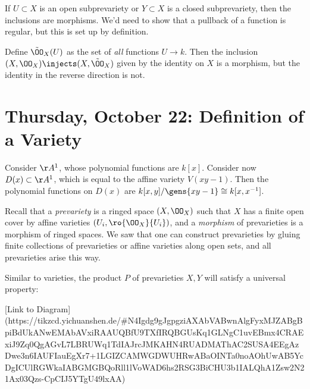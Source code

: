 \begin{remark}

If \(U\subset X\) is an open subprevariety or \(Y\subset X\) is a closed
subprevariety, then the inclusions are morphisms. We'd need to show that
a pullback of a function is regular, but this is set up by definition.

\end{remark}

\begin{remark}

Define \(\tilde \OO_X(U)\) as the set of \emph{all} functions
\(U\to k\). Then the inclusion \((X, \OO_X) \injects (X, \tilde \OO_X)\)
given by the identity on \(X\) is a morphism, but the identity in the
reverse direction is not.

\end{remark}

\hypertarget{thursday-october-22-definition-of-a-variety}{%
\section{Thursday, October 22: Definition of a
Variety}\label{thursday-october-22-definition-of-a-variety}}

\begin{example}

Consider \(\AA^1\), whose polynomial functions are \(k[x]\). Consider
now \(D(x) \subset \AA^1\), which is equal to the affine variety
\(V(xy-1)\). Then the polynomial functions on \(D(x)\) are
\(k[x, y] / \gens{xy-1} \cong k[x, x^{-1} ]\).

\end{example}

Recall that a \emph{prevariety} is a ringed space \((X, \OO_X)\) such
that \(X\) has a finite open cover by affine varieties
\((U_i, \ro{\OO_X}{U_i})\), and a \emph{morphism} of prevarieties is a
morphism of ringed spaces. We saw that one can construct prevarieties by
gluing finite collections of prevarieties or affine varieties along open
sets, and all prevarieties arise this way.

Similar to varieties, the product \(P\) of prevarieties \(X, Y\) will
satisfy a universal property:

\begin{center}
[Link to Diagram](https://tikzcd.yichuanshen.de/#N4Igdg9gJgpgziAXAbVABwnAlgFyxMJZABgBpiBdUkANwEMAbAVxiRAAUQBfU9TXfIRQBGUsKq1GLNgC1uvEBmx4CRAExiJ9Zq0QgAGvL7LBRUWq1TdIAJrcJMKAHN4RUADMAThAC2SUSA4EEgAzDwe3n6IAUFIauEgXr7+1LGIZCAMWGDWUHRwABaOINTa0noAOhUwAB5YcDgICUlRGWkaIABGMGBQoRll1lVoWAD6hs2RSG3BiCHU3b1IALQhA1Zsw2N21Ax03Qzs-CpCIJ5YTgU49lxAA)
\end{center}

